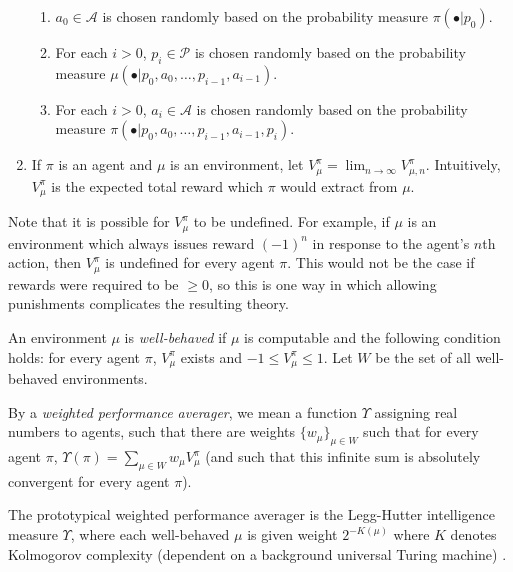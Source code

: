 \documentclass[runningheads]{llncs}
\begin{document}
\begin{definition}
\begin{enumerate}
\begin{enumerate}
            \item $a_0\in\mathcal A$ is chosen randomly based on the probability
            measure $\pi(\bullet|p_0)$.
            \item
            For each $i>0$,
            $p_i\in\mathcal P$ is chosen randomly based on
            the probability measure
            $\mu(\bullet|p_0,a_0,\ldots,p_{i-1},a_{i-1})$.
            \item
            For each $i>0$,
            $a_i\in\mathcal A$ is chosen randomly based on the probability measure
            $\pi(\bullet|p_0,a_0,\ldots,p_{i-1},a_{i-1},p_i)$.
        \end{enumerate}
        \item
        If $\pi$ is an agent and $\mu$ is an environment,
        let $V^\pi_\mu=\lim_{n\to\infty}V^{\pi}_{\mu,n}$.
        Intuitively, $V^\pi_\mu$ is the expected total reward which $\pi$ would extract
        from $\mu$.
    \end{enumerate}
\end{definition}

Note that it is possible for $V^\pi_\mu$ to be undefined.
For example, if $\mu$ is an environment which always issues
reward $(-1)^n$ in response to the agent's $n$th action,
then $V^\pi_\mu$ is undefined for every agent $\pi$.
This would not be the case if rewards were required to be $\geq 0$,
so this is one way in which allowing
punishments complicates the resulting theory.

\begin{definition}
    An environment $\mu$ is \emph{well-behaved} if $\mu$ is computable and the following
    condition holds: for every agent $\pi$, $V^\pi_\mu$ exists and
    $-1\leq V^\pi_\mu\leq 1$. Let $W$ be the set of all well-behaved environments.
\end{definition}

\begin{definition}
\label{performanceaveragerdefn}
    By a \emph{weighted performance averager}, we mean a function
    $\Upsilon$ assigning real numbers to agents, such that there
    are weights $\{w_\mu\}_{\mu\in W}$ such that for every agent
    $\pi$, $\Upsilon(\pi)=\sum_{\mu\in W}w_\mu V^\pi_\mu$
    (and such that this infinite sum is absolutely convergent
    for every agent $\pi$).
\end{definition}

The prototypical weighted performance averager is the Legg-Hutter intelligence
measure $\Upsilon$, where each well-behaved $\mu$ is given weight $2^{-K(\mu)}$
where $K$ denotes Kolmogorov complexity (dependent on a background universal
Turing machine) \cite{legg2007universal}.
\end{document}
